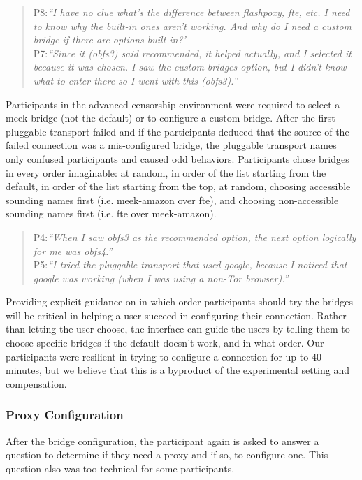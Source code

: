 \documentclass{template}
\begin{document}
\begin{quotation} 
\noindent P8:\textit{``I have no clue what's the difference between flashpoxy, fte, etc. I need to know why the built-in ones aren't working. And why do I need a custom bridge if there are options built in?'}\\

\noindent P7:\textit{``Since it (obfs3) said recommended, it helped actually, and I selected it because it was chosen. I saw the custom bridges option, but I didn't know what to enter there so I went with this (obfs3).''}
\end{quotation} 

Participants in the advanced censorship environment were required to select a meek bridge (not the default) or to configure a custom bridge. After the first pluggable transport failed and if the participants deduced that the source of the failed connection was a mis-configured bridge, the pluggable transport names only confused participants and caused odd behaviors. Participants chose bridges in every order imaginable: at random, in order of the list starting from the default, in order of the list starting from the top, at random, choosing accessible sounding names first (i.e. meek-amazon over fte), and choosing non-accessible sounding names first (i.e. fte over meek-amazon). 

\begin{quotation}
\noindent P4:\textit{``When I saw obfs3 as the recommended option, the next option logically for me was obfs4.''}\\

\noindent P5:\textit{``I tried the pluggable transport that used google, because I noticed that google was working (when I was using a non-Tor browser).''}
\end{quotation} 

Providing explicit guidance on in which order participants should try the bridges will be critical in helping a user succeed in configuring their connection. Rather than letting the user choose, the interface can guide the users by telling them to choose specific bridges if the default doesn't work, and in what order. Our participants were resilient in trying to configure a connection for up to 40 minutes, but we believe that this is a byproduct of the experimental setting and compensation. \\

\subsubsection{Proxy Configuration} 
After the bridge configuration, the participant again is asked to answer a question to determine if they need a proxy and if so, to configure one. This question also was too technical for some participants.
\end{document}
